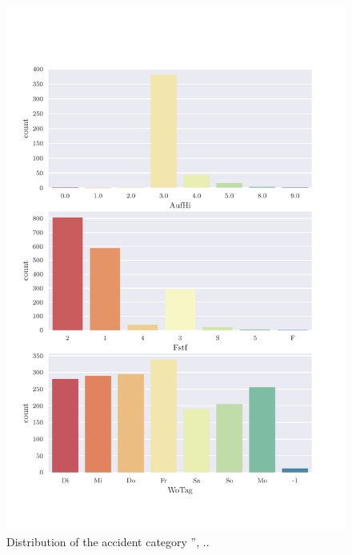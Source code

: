 \documentclass[a4paper,headsepline,footsepline,fontsize=11pt,BCOR=12mm,DIV=12]{report}
\begin{document}
\begin{appendices}
\begin{figure}[h]
	\centering
	\includegraphics[scale=0.7]{../CorrAnalysis/data/BAYSIS/02_matched/plots/baysis_matched_count_multiple02}
	\caption{Distribution of the accident category '', ..}
	\label{img:appendix_baysis_matched_02}
\end{figure}


\end{appendices}
\end{document}
